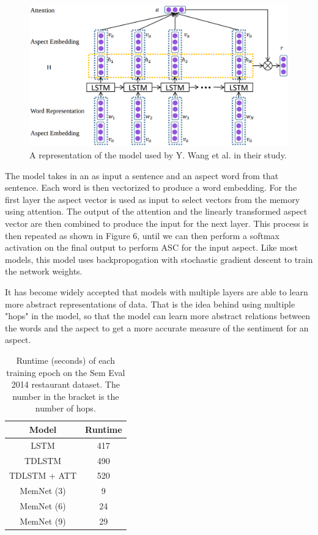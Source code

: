 \documentclass[conference]{IEEEtran}
\begin{document}
\begin{figure}
\centerline{\includegraphics[keepaspectratio, width=\textwidth]{pics/7.png}}
  \caption{A representation of the model used by Y. Wang et al. in their study.}
\end{figure}

The model takes in an as input a sentence and an aspect word from that sentence. Each word is then vectorized to produce a word embedding. For the first layer the aspect vector is used as input to select vectors from the memory using attention. The output of the attention and the linearly transformed aspect vector are then combined to produce the input for the next layer. This process is then repeated as shown in Figure 6, until we can then perform a softmax activation on the final output to perform ASC for the input aspect. Like most models, this model uses backpropogation with stochastic gradient descent to train the network weights.

It has become widely accepted that models with multiple layers are able to learn more abstract representations of data. That is the idea behind using multiple "hops" in the model, so that the model can learn more abstract relations between the words and the aspect to get a more accurate measure of the sentiment for an aspect.

\begin{table}[htbp]
\caption{Runtime (seconds) of each training epoch on the Sem Eval 2014 restaurant dataset. The number in the bracket is the number of hops.}
\begin{center}
\begin{tabular}{|c|c|}
\hline
\textbf{Model} & \textbf{Runtime} \\
\hline
LSTM & 417 \\
TDLSTM & 490 \\
TDLSTM + ATT & 520 \\
\hline
MemNet (3) & 9 \\
MemNet (6) & 24 \\
MemNet (9) & 29 \\
\hline
\end{tabular}
\end{center}
\end{table}
\end{document}
